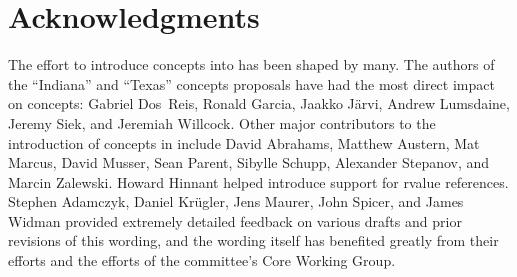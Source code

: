 \documentclass[american]{book}
\begin{document}
\section*{Acknowledgments}
The effort to introduce concepts into \Cpp{} has been shaped by
many. The authors of the ``Indiana'' and ``Texas'' concepts proposals
have had the most direct impact on concepts: Gabriel Dos~Reis, Ronald
Garcia, Jaakko J\"arvi, Andrew Lumsdaine, Jeremy Siek, and Jeremiah
Willcock. Other major contributors to the introduction of concepts in
\Cpp{} include David Abrahams, Matthew Austern, Mat Marcus, David
Musser, Sean Parent, Sibylle Schupp, Alexander Stepanov, and Marcin
Zalewski.
%
Howard Hinnant helped introduce support for rvalue references.
%
Stephen Adamczyk, Daniel Kr\"ugler, Jens Maurer, John Spicer, and James
Widman provided extremely
detailed feedback on various drafts and prior revisions of this
wording, and the wording itself has benefited greatly from their
efforts and the efforts of the \Cpp{} committee's Core Working Group. 



\end{document}
